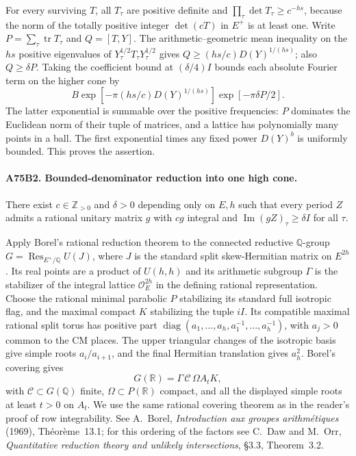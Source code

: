 For every surviving $T$, all $T_\tau$ are positive definite and
$\prod_\tau\det T_\tau\ge c^{-hs}$, because the norm of the totally
positive integer $\det(cT)$ in $E^+$ is at least one. Write
$P=\sum_\tau\operatorname{tr} T_\tau$ and $Q=[T,Y]$.
The arithmetic--geometric mean inequality on the $hs$ positive
eigenvalues of $Y_\tau^{1/2}T_\tau Y_\tau^{1/2}$ gives
$Q\ge (hs/c)D(Y)^{1/(hs)}$; also $Q\ge\delta P$.
Taking the coefficient bound at $(\delta/4)I$ bounds each absolute
Fourier term on the higher cone by
\[
 B\exp[-\pi(hs/c)D(Y)^{1/(hs)}]\exp[-\pi\delta P/2].
\]
The latter exponential is summable over the positive frequencies:
$P$ dominates the Euclidean norm of their tuple of matrices, and
a lattice has polynomially many points in a ball. The first
exponential times any fixed power $D(Y)^b$ is uniformly bounded.
This proves the assertion.

\paragraph{A75B2. Bounded-denominator reduction into one high cone.}
There exist $c\in\mathbb Z_{>0}$ and $\delta>0$ depending only on
$E,h$ such that every period $Z$ admits a rational unitary matrix
$g$ with $cg$ integral and $\operatorname{Im}(gZ)_\tau\ge\delta I$
for all $\tau$.

Apply Borel's rational reduction theorem to the connected reductive
$\mathbb Q$-group $G=\operatorname{Res}_{E^+/\mathbb Q}U(J)$,
where $J$ is the standard split skew-Hermitian matrix on $E^{2h}$.
Its real points are a product of $U(h,h)$ and its arithmetic subgroup
$\Gamma$ is the stabilizer of the integral lattice $\mathcal O_E^{2h}$
in the defining rational representation. Choose the rational minimal
parabolic $P$ stabilizing its standard full isotropic flag, and the
maximal compact $K$ stabilizing the tuple $iI$. Its compatible
maximal rational split torus has positive part
$\operatorname{diag}(a_1,\ldots,a_h,a_1^{-1},\ldots,a_h^{-1})$,
with $a_j>0$ common to the CM places. The upper triangular changes of
the isotropic basis give simple roots $a_i/a_{i+1}$, and the final
Hermitian translation gives $a_h^2$. Borel's covering gives
\[
 G(\mathbb R)=\Gamma\,\mathcal C\,\Omega A_t K,
\]
with $\mathcal C\subset G(\mathbb Q)$ finite, $\Omega\subset P(\mathbb R)$
compact, and all the displayed simple roots at least $t>0$ on $A_t$.
We use the same rational covering theorem as in the reader's proof
of row integrability. See A.~Borel, \emph{Introduction aux groupes
arithm\'etiques} (1969), Th\'eor\`eme~13.1; for this ordering of the
factors see C.~Daw and M.~Orr, \emph{Quantitative reduction theory
and unlikely intersections}, \S3.3, Theorem~3.2.

